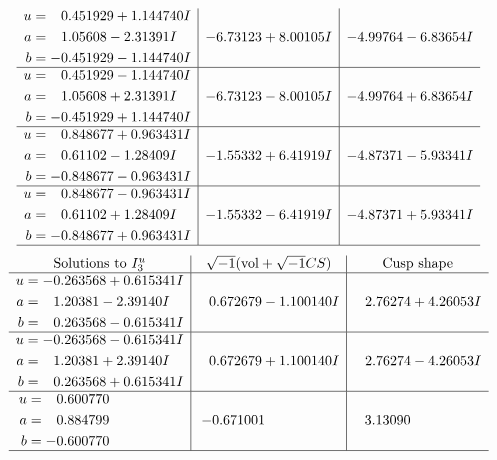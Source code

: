 \documentclass[1p]{elsarticle_modified}
\theoremstyle{definition}
\newcommand{\I}{\sqrt{-1}}
\begin{document}
$$\begin{array}{c|c|c}
\begin{aligned}
u &= \phantom{-}0.451929 + 1.144740 I \\
a &= \phantom{-}1.05608 - 2.31391 I \\
b &= -0.451929 - 1.144740 I\end{aligned}
 & -6.73123 + 8.00105 I & -4.99764 - 6.83654 I \\ \hline\begin{aligned}
u &= \phantom{-}0.451929 - 1.144740 I \\
a &= \phantom{-}1.05608 + 2.31391 I \\
b &= -0.451929 + 1.144740 I\end{aligned}
 & -6.73123 - 8.00105 I & -4.99764 + 6.83654 I \\ \hline\begin{aligned}
u &= \phantom{-}0.848677 + 0.963431 I \\
a &= \phantom{-}0.61102 - 1.28409 I \\
b &= -0.848677 - 0.963431 I\end{aligned}
 & -1.55332 + 6.41919 I & -4.87371 - 5.93341 I \\ \hline\begin{aligned}
u &= \phantom{-}0.848677 - 0.963431 I \\
a &= \phantom{-}0.61102 + 1.28409 I \\
b &= -0.848677 + 0.963431 I\end{aligned}
 & -1.55332 - 6.41919 I & -4.87371 + 5.93341 I\\
 \hline 
 \end{array}$$\newpage$$\begin{array}{c|c|c}  
\text{Solutions to }I^u_{3}& \I (\text{vol} + \sqrt{-1}CS) & \text{Cusp shape}\\
 \hline 
\begin{aligned}
u &= -0.263568 + 0.615341 I \\
a &= \phantom{-}1.20381 - 2.39140 I \\
b &= \phantom{-}0.263568 - 0.615341 I\end{aligned}
 & \phantom{-}0.672679 - 1.100140 I & \phantom{-}2.76274 + 4.26053 I \\ \hline\begin{aligned}
u &= -0.263568 - 0.615341 I \\
a &= \phantom{-}1.20381 + 2.39140 I \\
b &= \phantom{-}0.263568 + 0.615341 I\end{aligned}
 & \phantom{-}0.672679 + 1.100140 I & \phantom{-}2.76274 - 4.26053 I \\ \hline\begin{aligned}
u &= \phantom{-}0.600770\phantom{ +0.000000I} \\
a &= \phantom{-}0.884799\phantom{ +0.000000I} \\
b &= -0.600770\phantom{ +0.000000I}\end{aligned}
 & -0.671001\phantom{ +0.000000I} & \phantom{-}3.13090\phantom{ +0.000000I}\\
 \hline 
 \end{array}$$\newpage\newpage\renewcommand{\arraystretch}{1}
\end{document}
